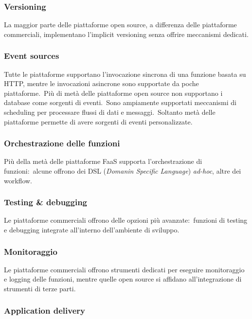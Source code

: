 \subsubsection{Versioning}

La maggior parte delle piattaforme open source, a differenza delle piattaforme commerciali, implementano l'implicit versioning senza offrire meccanismi dedicati.

\subsubsection{Event sources}

Tutte le piattaforme supportano l'invocazione sincrona di una funzione basata su HTTP, mentre le invocazioni asincrone sono supportate da poche piattaforme.\
Più di metà delle piattaforme open source non supportano i database come sorgenti di eventi.\
Sono ampiamente supportati meccanismi di scheduling per processare flussi di dati e messaggi.\
Soltanto metà delle piattaforme permette di avere sorgenti di eventi personalizzate.

\subsubsection{Orchestrazione delle funzioni}

Più della metà delle piattaforme FaaS supporta l'orchestrazione di funzioni:\ alcune offrono dei DSL (\textit{Domanin Specific Language}) \textit{ad-hoc}, altre dei workflow.

\subsubsection{Testing \& debugging}

Le piattaforme commerciali offrono delle opzioni più avanzate:\ funzioni di testing e debugging integrate all'interno dell'ambiente di sviluppo.

\subsubsection{Monitoraggio}

Le piattaforme commerciali offrono strumenti dedicati per eseguire monitoraggio e logging delle funzioni, mentre quelle open source si affidano all'integrazione di strumenti di terze parti.

\subsubsection{Application delivery}

